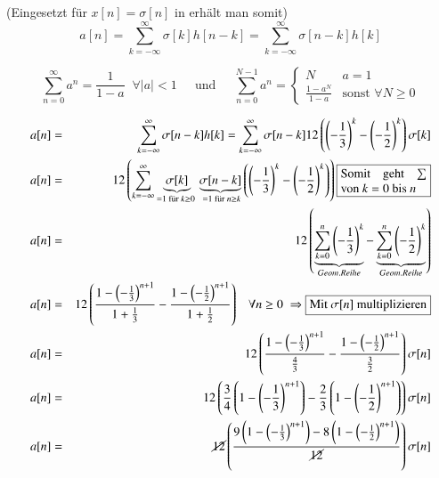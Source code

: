\begin{uebsp}
\begin{Answer}
\begin{enumerate}[a)]
\begin{uebsp_theory}
        (Eingesetzt für $x[n]=\sigma[n]$ in  erhält man somit)
        \[a[n]=\sum_{k=-\infty}^\infty \sigma[k]h[n-k]=\sum_{k=-\infty}^\infty
        \sigma[n-k]h[k]\]
    \end{uebsp_theory}
    \begin{definition}
        \[\sum_{n=0}^\infty a^n=\frac{1}{1-a}\;\;\forall
            |a|<1\;\;\;\;\text{ und }\;\;\;\;
            \sum_{n=0}^{N-1} a^n=\begin{cases}N&a=1\\
                \frac{1-a^N}{1-a}&\text{sonst }\forall N\geq0\end{cases}\]
    \end{definition}
    \begin{eqnarray*}
        a[n]&=&\sum_{k=-\infty}^\infty\sigma[n-k]h[k]=
            \sum_{k=-\infty}^\infty\sigma[n-k]12\left(\left(-\frac{1}{3}\right)^k-\left(-\frac{1}{2}\right)^k\right)\sigma[k]\\
        a[n]&=&12\left(\sum_{k=-\infty}^\infty\underbrace{\sigma[k]}_{=1\text{
            für }k\geq0\;}\underbrace{\sigma[n-k]}_{\;=1\text{ für }n\geq
            k}\left(\left(-\frac{1}{3}\right)^k-\left(-\frac{1}{2}\right)^k\right)\right)
            \fbox{\begin{minipage}{0.2\linewidth}Somit
                geht $\sum$ von $k=0$ bis $n$\end{minipage}}\\
        a[n]&=&12\left(\underbrace{\sum_{k=0}^n\left(-\frac{1}{3}\right)^k}_{Geom. Reihe}
            -\underbrace{\sum_{k=0}^n\left(-\frac{1}{2}\right)^k}_{Geom. Reihe}\right)\\
        a[n]&=&12\left(\frac{1-\left(-\frac{1}{3}\right)^{n+1}}{1+\frac{1}{3}}
            -\frac{1-\left(-\frac{1}{2}\right)^{n+1}}{1+\frac{1}{2}}\right)\;\;\;\forall
            n\geq0\;\Rightarrow\fbox{Mit $\sigma[n]$ multiplizieren}\\
        a[n]&=&12\left(\frac{1-\left(-\frac{1}{3}\right)^{n+1}}{\frac{4}{3}}
            -\frac{1-\left(-\frac{1}{2}\right)^{n+1}}{\frac{3}{2}}\right)\sigma[n]\\
        a[n]&=&12\left(\frac{3}{4}\left(1-\left(-\frac{1}{3}\right)^{n+1}\right)
            -\frac{2}{3}\left(1-\left(-\frac{1}{2}\right)^{n+1}\right)\right)\sigma[n]\\
        a[n]&=&\cancel{12}\left(\frac{9\left(1-\left(-\frac{1}{3}\right)^{n+1}\right)
            -8\left(1-\left(-\frac{1}{2}\right)^{n+1}\right)}{\cancel{12}}\right)\sigma[n]\\

\end{eqnarray*}
\end{enumerate}
\end{Answer}
\end{uebsp}
